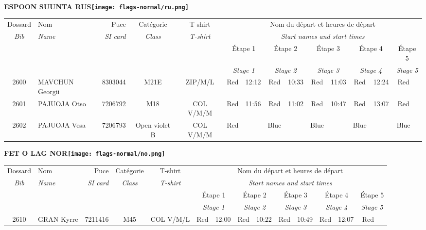 \documentclass{report}
\begin{document}
\newpage
  \Huge \centering \bfseries ESPOON SUUNTA  RUS\normalfont \footnotesize \sffamily \hfill \texttt{[image: flags-normal/ru.png]} \newline 
  \begin{longtable}{|c|l|r|c|c|*{5}{cc|}}
    Dossard & Nom  & Puce    & Catégorie & T-shirt & \multicolumn{10}{c|}{Nom du départ et heures de départ} \\
    \itshape Bib     & \itshape Name & \itshape SI card & \itshape Class  & \itshape  T-shirt  & \multicolumn{10}{c|}{\itshape Start names and start times} \\
    \hline
    & & & & & \multicolumn{2}{c|}{Étape 1} & \multicolumn{2}{c|}{Étape 2} & \multicolumn{2}{c|}{Étape 3} & \multicolumn{2}{c|}{Étape 4} & \multicolumn{2}{c|}{Étape 5} \\
    & & & & & \multicolumn{2}{c|}{\itshape Stage 1} & \multicolumn{2}{c|}{\itshape Stage 2} & \multicolumn{2}{c|}{\itshape Stage 3} & \multicolumn{2}{c|}{\itshape Stage 4} & \multicolumn{2}{c|}{\itshape Stage 5} \\
    \hline
    2600 & MAVCHUN Georgii & 8303044 & M21E & ZIP/M/L & Red & 12:12 & Red & 10:33 & Red & 11:03 & Red & 12:24 & Red &  \\
    2601 & PAJUOJA Otso & 7206792 & M18 & COL V/M/M & Red & 11:56 & Red & 11:02 & Red & 10:47 & Red & 13:07 & Red &  \\
    2602 & PAJUOJA Vesa & 7206793 & Open violet B & COL V/M/M & Red &   & Blue &   & Blue &   & Blue &   & Blue &  \\
  \end{longtable}
\newpage
  \Huge \centering \bfseries FET O LAG  NOR\normalfont \footnotesize \sffamily \hfill \texttt{[image: flags-normal/no.png]} \newline 
  \begin{longtable}{|c|l|r|c|c|*{5}{cc|}}
    Dossard & Nom  & Puce    & Catégorie & T-shirt & \multicolumn{10}{c|}{Nom du départ et heures de départ} \\
    \itshape Bib     & \itshape Name & \itshape SI card & \itshape Class  & \itshape  T-shirt  & \multicolumn{10}{c|}{\itshape Start names and start times} \\
    \hline
    & & & & & \multicolumn{2}{c|}{Étape 1} & \multicolumn{2}{c|}{Étape 2} & \multicolumn{2}{c|}{Étape 3} & \multicolumn{2}{c|}{Étape 4} & \multicolumn{2}{c|}{Étape 5} \\
    & & & & & \multicolumn{2}{c|}{\itshape Stage 1} & \multicolumn{2}{c|}{\itshape Stage 2} & \multicolumn{2}{c|}{\itshape Stage 3} & \multicolumn{2}{c|}{\itshape Stage 4} & \multicolumn{2}{c|}{\itshape Stage 5} \\
    \hline
    2610 & GRAN Kyrre & 7211416 & M45 & COL V/M/L & Red & 12:00 & Red & 10:22 & Red & 10:49 & Red & 12:07 & Red &  \\
  \end{longtable}
\end{document}
